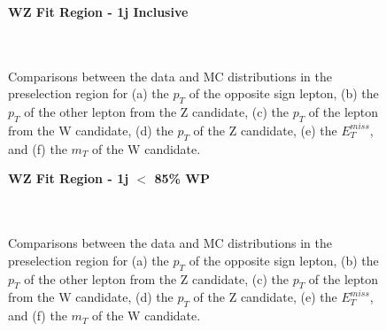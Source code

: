 \begin{figure}[H]
    \centering
    \textbf{WZ Fit Region - 1j Inclusive}\\                                                                                  
    \\                     
    \\                     
    \caption{Comparisons between the data and MC distributions in the preselection region for (a) the $p_T$ of the opposite sign lepton, (b) the $p_T$ of the other lepton from the Z candidate, (c) the $p_T$ of the lepton from the W candidate, (d) the $p_T$ of the Z candidate, (e) the $E_T^{miss}$, and (f) the $m_T$ of the W candidate.}                                      
    \label{kin:WP_1j_inc}                                                                                                    
\end{figure}

\begin{figure}[H]
    \centering
    \textbf{WZ Fit Region - 1j $<$ 85\% WP}\\
    \\
    \\
    \caption{Comparisons between the data and MC distributions in the preselection region for (a) the $p_T$ of the opposite sign lepton, (b) the $p_T$ of the other lepton from the Z candidate, (c) the $p_T$ of the lepton from the W candidate, (d) the $p_T$ of the Z candidate, (e) the $E_T^{miss}$, and (f) the $m_T$ of the W candidate.}
    \label{kin:WP_1j_not85}
\end{figure}

